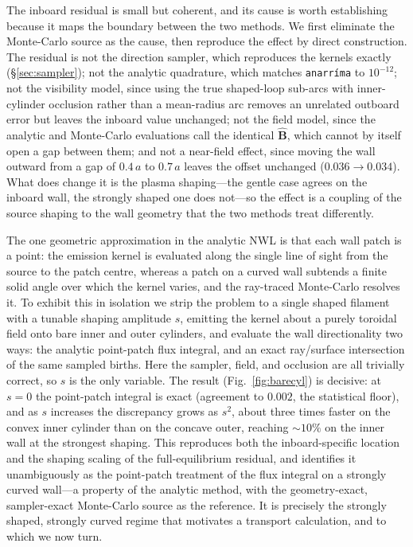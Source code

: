 \documentclass[11pt]{article}
\newcommand{\Bhat}{\hat{\bm{B}}}
\begin{document}
The inboard residual is small but coherent, and its cause is worth establishing because it
maps the boundary between the two methods. We first eliminate the Monte-Carlo source as the
cause, then reproduce the effect by direct construction. The residual is not the direction
sampler, which reproduces the kernels exactly (\S\ref{sec:sampler}); not the analytic
quadrature, which matches \texttt{anarr\'ima} to $10^{-12}$; not the visibility model,
since using the true shaped-loop sub-arcs with inner-cylinder occlusion rather than a
mean-radius arc removes an unrelated outboard error but leaves the inboard value unchanged;
not the field model, since the analytic and Monte-Carlo evaluations call the identical
$\Bhat$, which cannot by itself open a gap between them; and not a near-field effect, since
moving the wall outward from a gap of $0.4\,a$ to $0.7\,a$ leaves the offset unchanged
($0.036\to0.034$). What does change it is the plasma shaping---the gentle case agrees on
the inboard wall, the strongly shaped one does not---so the effect is a coupling of the
source shaping to the wall geometry that the two methods treat differently.

The one geometric approximation in the analytic NWL is that each wall patch is a point: the
emission kernel is evaluated along the single line of sight from the source to the patch
centre, whereas a patch on a curved wall subtends a finite solid angle over which the
kernel varies, and the ray-traced Monte-Carlo resolves it. To exhibit this in isolation we
strip the problem to a single shaped filament with a tunable shaping amplitude $s$, emitting
the kernel about a purely toroidal field onto bare inner and outer cylinders, and evaluate
the wall directionality two ways: the analytic point-patch flux integral, and an exact
ray/surface intersection of the same sampled births. Here the sampler, field, and occlusion
are all trivially correct, so $s$ is the only variable. The result (Fig.~\ref{fig:barecyl})
is decisive: at $s=0$ the point-patch integral is exact (agreement to $0.002$, the
statistical floor), and as $s$ increases the discrepancy grows as $s^2$, about three times
faster on the convex inner cylinder than on the concave outer, reaching $\sim10\%$ on the
inner wall at the strongest shaping. This reproduces both the inboard-specific location and
the shaping scaling of the full-equilibrium residual, and identifies it unambiguously as
the point-patch treatment of the flux integral on a strongly curved wall---a property of
the analytic method, with the geometry-exact, sampler-exact Monte-Carlo source as the
reference. It is precisely the strongly shaped, strongly curved regime that motivates a
transport calculation, and to which we now turn.
\end{document}
